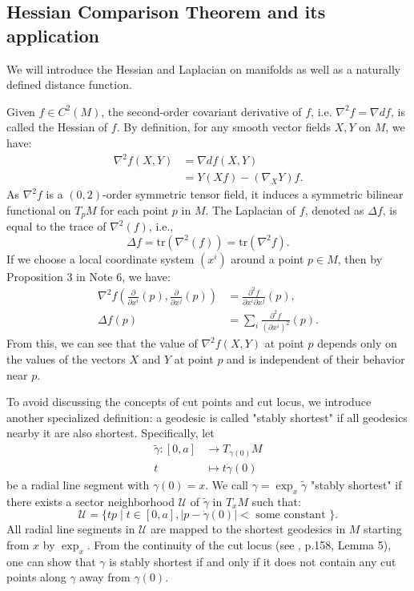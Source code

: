\documentclass{ctexart}
\begin{document}
\subsection*{Hessian Comparison Theorem and its application}
We will introduce the Hessian and Laplacian on manifolds as well as a naturally defined distance function.

Given $f\in C^2(M)$, the second-order covariant derivative of $f$, i.e. $\nabla^2 f = \nabla df$, is called the Hessian of $f$. 
By definition, for any smooth vector fields $X, Y$ on $M$, we have:
$$
\begin{aligned}
\nabla^2 f(X, Y) &= \nabla df(X, Y) \\
&= Y(Xf) - (\nabla_X Y)f.
\end{aligned}
$$
As $\nabla^2 f$ is a $(0,2)$-order symmetric tensor field, 
it induces a symmetric bilinear functional on $T_p M$ for each point $p$ in $M$.
The Laplacian of $f$, denoted as $\Delta f$, is equal to the trace of $\nabla^2(f)$, i.e.,
$$
\Delta f = \text{tr}(\nabla^2(f)) = \text{tr}(\nabla^2 f).
$$
If we choose a local coordinate system $(x^i)$ around a point $p \in M$, then by Proposition 3 in Note 6, we have:
$$
\begin{aligned}
\nabla^2 f\left(\frac{\partial}{\partial x^i}(p), \frac{\partial}{\partial x^j}(p)\right) &= \frac{\partial^2 f}{\partial x^i \partial x^j}(p), \\
\Delta f(p) &= \sum_i \frac{\partial^2 f}{\left(\partial x^i\right)^2}(p).
\end{aligned}
$$
From this, we can see that the value of $\nabla^2 f(X, Y)$ at point $p$ depends only on the values of the vectors $X$ and $Y$ at point $p$ and is independent of their behavior near $p$.

To avoid discussing the concepts of cut points and cut locus, we introduce another specialized definition: a geodesic is called "stably shortest" if all geodesics nearby it are also shortest. Specifically, let
$$
\begin{aligned}
  \widetilde{\gamma}:[0, a] &\rightarrow T_{\gamma(0)} M \\
  t &\mapsto t \dot{\gamma}(0)
\end{aligned}
$$
be a radial line segment with $\gamma(0)=x$. We call $\gamma=\exp _x \widetilde{\gamma}$ "stably shortest" if there exists a sector neighborhood $\mathcal{U}$ of $\widetilde{\gamma}$ in $T_x M$ such that:
$$
\mathcal{U}=\{t p\mid t \in[0, a],|p-\dot{\gamma}(0)|<\text { some constant }\}.
$$
All radial line segments in $\mathcal{U}$ are mapped to the shortest geodesics in $M$ starting from $x$ by $\exp _x$. 
From the continuity of the cut locus (see \cite{WuHongXi2014}, p.158, Lemma 5), one can show that 
$\gamma$ is stably shortest if and only if it does not contain any cut points along $\gamma$ away from $\gamma(0)$.
\end{document}
